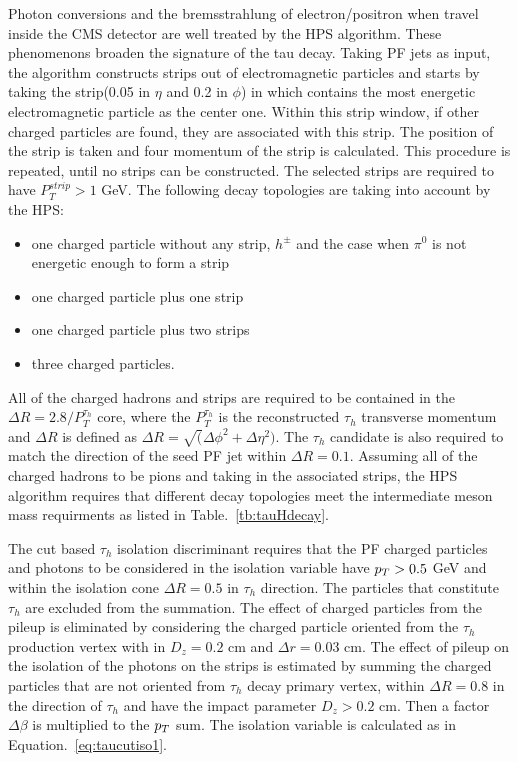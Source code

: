 Photon conversions and the bremsstrahlung of electron/positron when travel inside the CMS detector are well treated by the HPS algorithm. These phenomenons broaden the signature of the tau decay. Taking PF jets as input, the algorithm constructs strips out of electromagnetic particles and starts by taking the strip(0.05 in $\eta$ and 0.2 in $\phi$) in which contains the most energetic electromagnetic particle as the center one. Within this strip window, if other charged particles are found, they are associated with this strip. The position of the strip is taken and four momentum of the strip is calculated. This procedure is repeated, until no strips can be constructed. The selected strips are required to have $P_{T}^{strip}>1$ GeV. The following decay topologies are taking into account by the HPS:
\begin{itemize}
\item one charged particle without any strip, $h^{\pm}$ and the case when $\pi^{0}$ is not energetic enough to form a strip
\item one charged particle plus one strip
\item one charged particle plus two strips
\item three charged particles. 
\end{itemize} 

All of the charged hadrons and strips are required to be contained in the $\Delta R=2.8/P_{T}^{\tau_{h}}$ core, where the $P_{T}^{\tau_{h}}$ is the reconstructed $\tau_{h}$ transverse momentum and $\Delta R$ is defined as $\Delta R=\sqrt(\Delta \phi^{2}+\Delta \eta^{2})$. The $\tau_{h}$ candidate is also required to match the direction of the seed PF jet within $\Delta R=0.1$. Assuming all of the charged hadrons to be pions and taking in the associated strips, the HPS algorithm requires that different decay topologies meet the intermediate meson mass requirments as listed in Table.~\ref{tb:tauHdecay}. 

The cut based $\tau_{h}$ isolation discriminant requires that the PF charged particles and photons to be considered in the isolation variable have $p_{T}>0.5$ GeV and within the isolation cone  $\Delta R=0.5$ in $\tau_{h}$ direction. The particles that  constitute $\tau_{h}$ are excluded from the summation. The effect of charged particles from the pileup is eliminated by considering the charged particle oriented from the $\tau_{h}$ production vertex with in $D_{z}=0.2$ cm and $\Delta r=0.03$ cm. The effect of pileup on the isolation of the photons on the strips is estimated by summing the charged particles that are not oriented from $\tau_{h}$ decay primary vertex, within $\Delta R=0.8$ in the direction of $\tau_{h}$ and have the impact parameter $D_{z}>0.2$ cm. Then a factor $\Delta \beta$ is multiplied to the $p_{T}$ sum. The isolation variable is calculated as in Equation.~\ref{eq:taucutiso1}.

